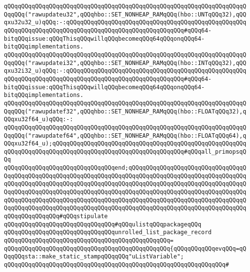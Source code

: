 \verb|qQQqqQQqqQQqqQQqqQQqqQQqqQQqqQQqqQQqqQQqqQQqqQQqqQQqqQQqqQQqqQQqqQQqqQQqqQQq("rawupdateu32",qQQqhbo::SET_NONHEAP_RAMqQQq(hbo::UNTqQQq32),qQQqxu32u32_u)qQQq:-:qQQqqQQqqQQqqQQqqQQqqQQqqQQqqQQqqQQqqQQqqQQqqQQqqQQqqQQqqQQqqQQqqQQqqQQqqQQqqQQqqQQqqQQqqQQqqQQqqQQqqQQq#qQQq64-bitqQQqissue:qQQqThisqQQqwillqQQqbecomeqQQq64qQQqonqQQq64-bitqQQqimplementations.|\newline
\verb|qQQqqQQqqQQqqQQqqQQqqQQqqQQqqQQqqQQqqQQqqQQqqQQqqQQqqQQqqQQqqQQqqQQqqQQqqQQq("rawupdatei32",qQQqhbo::SET_NONHEAP_RAMqQQq(hbo::INTqQQq32),qQQqxu32i32_u)qQQq:-:qQQqqQQqqQQqqQQqqQQqqQQqqQQqqQQqqQQqqQQqqQQqqQQqqQQqqQQqqQQqqQQqqQQqqQQqqQQqqQQqqQQqqQQqqQQqqQQqqQQqqQQq#qQQq64-bitqQQqissue:qQQqThisqQQqwillqQQqbecomeqQQq64qQQqonqQQq64-bitqQQqimplementations.|\newline
\verb|qQQqqQQqqQQqqQQqqQQqqQQqqQQqqQQqqQQqqQQqqQQqqQQqqQQqqQQqqQQqqQQqqQQqqQQqqQQq("rawupdatef32",qQQqhbo::SET_NONHEAP_RAMqQQq(hbo::FLOATqQQq32),qQQqxu32f64_u)qQQq:-:|\newline
\verb|qQQqqQQqqQQqqQQqqQQqqQQqqQQqqQQqqQQqqQQqqQQqqQQqqQQqqQQqqQQqqQQqqQQqqQQqqQQq("rawupdatef64",qQQqhbo::SET_NONHEAP_RAMqQQq(hbo::FLOATqQQq64),qQQqxu32f64_u);qQQqqQQqqQQqqQQqqQQqqQQqqQQqqQQqqQQqqQQqqQQqqQQqqQQqqQQqqQQqqQQqqQQqqQQqqQQqqQQqqQQqqQQqqQQqqQQqqQQqqQQqqQQq#qQQqall_primopsqQQq|\newline
\newline
\verb|qQQqqQQqqQQqqQQqqQQqqQQqqQQqqQQqend;qQQqqQQqqQQqqQQqqQQqqQQqqQQqqQQqqQQqqQQqqQQqqQQqqQQqqQQqqQQqqQQqqQQqqQQqqQQqqQQqqQQqqQQqqQQqqQQqqQQqqQQqqQQqqQQqqQQqqQQqqQQqqQQqqQQqqQQqqQQqqQQqqQQqqQQqqQQqqQQqqQQqqQQqqQQqqQQqqQQqqQQqqQQqqQQqqQQqqQQqqQQqqQQqqQQqqQQqqQQqqQQqqQQqqQQqqQQqqQQqqQQqqQQqqQQqqQQqqQQqqQQqqQQqqQQqqQQqqQQqqQQqqQQqqQQqqQQqqQQqqQQqqQQqqQQqqQQqqQQqqQQqqQQqqQQqqQQqqQQqqQQqqQQqqQQqqQQqqQQqqQQqqQQqqQQqqQQqqQQqqQQqqQQqqQQqqQQqqQQq#qQQqstipulate|\newline
\newline
\verb|qQQqqQQqqQQqqQQqqQQqqQQqqQQqqQQq#qQQqulistqQQqpackageqQQq|\newline
\verb|qQQqqQQqqQQqqQQqqQQqqQQqqQQqqQQqunrolled_list_package_record|\newline
\verb|qQQqqQQqqQQqqQQqqQQqqQQqqQQqqQQqqQQqqQQqqQQqqQQq=|\newline
\verb|qQQqqQQqqQQqqQQqqQQqqQQqqQQqqQQqqQQqqQQqqQQqqQQq{qQQqqQQqqQQqevqQQq=qQQqqQQqsta::make_static_stampqQQqqQQq"uListVariable";|\newline
\verb|qQQqqQQqqQQqqQQqqQQqqQQqqQQqqQQqqQQqqQQqqQQqqQQqqQQqqQQqqQQqqQQq#|\newline
